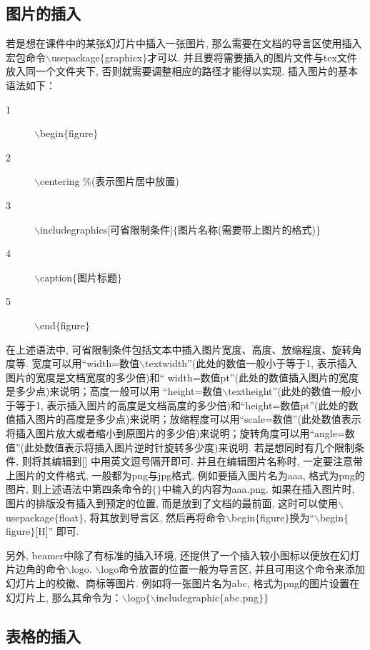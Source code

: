 \subsection{图片的插入}
若是想在课件中的某张幻灯片中插入一张图片, 那么需要在文档的导言区使用插入宏包命令$\backslash$usepackage$\{$graphicx$\}$才可以. 并且要将需要插入的图片文件与tex文件放入同一个文件夹下, 否则就需要调整相应的路径才能得以实现. 插入图片的基本语法如下：
\begin{description}
  \item[1]$\backslash$begin$\{$figure$\}$
 \item[2]$\backslash$centering \hspace{10pt}\%(表示图片居中放置)
 \item[3]$\backslash$includegraphics[可省限制条件]$\{$图片名称(需要带上图片的格式)$\}$
 \item[4]$\backslash$caption$\{$图片标题$\}$
 \item[5]$\backslash$end$\{$figure$\}$
\end{description}

在上述语法中, 可省限制条件包括文本中插入图片宽度、高度、放缩程度、旋转角度等. 宽度可以用“width=数值$\backslash$textwidth”(此处的数值一般小于等于1, 表示插入图片的宽度是文档宽度的多少倍)和“ width=数值pt”(此处的数值插入图片的宽度是多少点)来说明；高度一般可以用
“height=数值$\backslash$textheight”(此处的数值一般小于等于1, 表示插入图片的高度是文档高度的多少倍)和“height=数值pt”(此处的数值插入图片的高度是多少点)来说明；放缩程度可以用“scale=数值”(此处数值表示将插入图片放大或者缩小到原图片的多少倍)来说明；旋转角度可以用“angle=数值”(此处数值表示将插入图片逆时针旋转多少度)来说明. 若是想同时有几个限制条件, 则将其编辑到[] 中用英文逗号隔开即可. 并且在编辑图片名称时, 一定要注意带上图片的文件格式, 一般都为png与jpg格式, 例如要插入图片名为aaa, 格式为png的图片, 则上述语法中第四条命令的$\{\}$中输入的内容为aaa.png. 如果在插入图片时, 图片的排版没有插入到预定的位置, 而是放到了文档的最前面, 这时可以使用$\backslash$usepackage$\{$float$\}$, 将其放到导言区, 然后再将命令$\backslash$begin$\{$figure$\}$换为“$\backslash$begin$\{$figure$\}$[H]” 即可.


另外, beamer中除了有标准的插入环境, 还提供了一个插入较小图标以便放在幻灯片边角的命令$\backslash$logo. $\backslash$logo命令放置的位置一般为导言区, 并且可用这个命令来添加幻灯片上的校徽、商标等图片. 例如将一张图片名为abc, 格式为png的图片设置在幻灯片上, 那么其命令为：$\backslash$logo$\{\backslash$includegraphic$\{$abc.png$\}\}$

\subsection{表格的插入}

